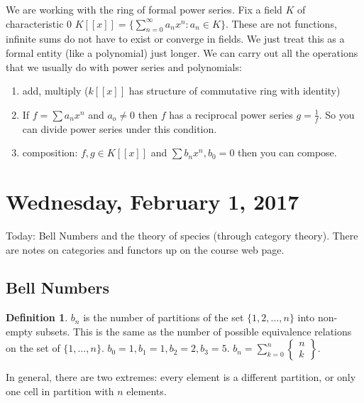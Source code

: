 \documentclass[12pt]{article}
\theoremstyle{definition}
\newtheorem{defn}{Definition}
\begin{document}
We are working with the ring of formal power series. Fix a field $K$ of
characteristic 0 $K[[x]] = \{\sum_{n=0}^\infty a_n x^n : a_n \in K\}$. These
are not functions, infinite sums do not have to exist or converge in fields. We
just treat this as a formal entity (like a polynomial) just longer. We can
carry out all the operations that we usually do with power series and
polynomials:
\begin{enumerate}
    \item add, multiply ($k[[x]]$ has structure of commutative ring with identity)
    \item If $f = \sum a_nx^n $ and $a_o \ne 0$ then $f$ has a reciprocal power
    series $g = \frac{1}{f}$. So you can divide power series under this condition.
    \item composition: $f, g \in  K[[x]]$ and $\sum b_n x^n, b_0 = 0$ then you can compose.
\end{enumerate}

\section{Wednesday, February 1, 2017}

Today: Bell Numbers and the theory of species (through category theory). There
are notes on categories and functors up on the course web page.

\subsection{Bell Numbers}

\begin{defn}
    $b_n$ is the number of partitions of the set $\{1, 2, \ldots, n \}$ into
    non-empty subsets. This is the same as the number of possible equivalence
    relations on the set of $\{1, \ldots, n\}$. $b_0 = 1, b_1 = 1, b_2 = 2, b_3
    = 5$. $b_n = \sum_{k=0}^n \begin{Bmatrix} n \\ k \end{Bmatrix}$.
\end{defn}

In general, there are two extremes: every element is a different partition, or
only one cell in partition with $n$ elements.
\end{document}
